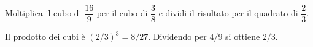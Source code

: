 
\begin{esercizio}
Moltiplica il cubo di $\dfrac{16}{9}$ per il cubo di $\dfrac38$ e dividi il risultato per il quadrato di $\dfrac23$.
\end{esercizio}

\begin{soluzione}
Il prodotto dei cubi è $(2/3)^3=8/27$. Dividendo per $4/9$ si ottiene $2/3$.
\end{soluzione}
